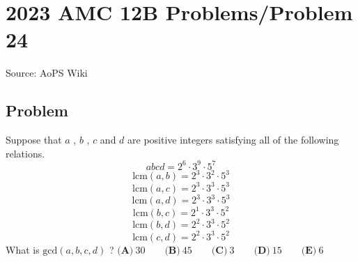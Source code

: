 \documentclass[12pt]{article}
\begin{document}
\section*{{2023 AMC 12B Problems/Problem 24}}
Source: AoPS Wiki

\subsection*{Problem}
Suppose that $a$ , $b$ , $c$ and $d$ are positive integers satisfying all of the following relations. \[abcd=2^6\cdot 3^9\cdot 5^7\] \[\text{lcm}(a,b)=2^3\cdot 3^2\cdot 5^3\] \[\text{lcm}(a,c)=2^3\cdot 3^3\cdot 5^3\] \[\text{lcm}(a,d)=2^3\cdot 3^3\cdot 5^3\] \[\text{lcm}(b,c)=2^1\cdot 3^3\cdot 5^2\] \[\text{lcm}(b,d)=2^2\cdot 3^3\cdot 5^2\] \[\text{lcm}(c,d)=2^2\cdot 3^3\cdot 5^2\] What is $\text{gcd}(a,b,c,d)$ ? $\textbf{(A)}~30\qquad\textbf{(B)}~45\qquad\textbf{(C)}~3\qquad\textbf{(D)}~15\qquad\textbf{(E)}~6$
\end{document}
